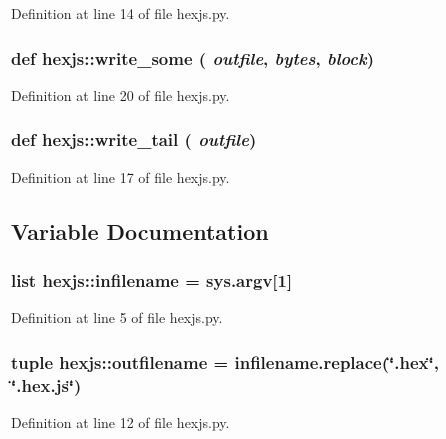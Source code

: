 Definition at line 14 of file hexjs.py.

\hypertarget{namespacehexjs_a4e78f97739ff44f824e42ecf26fa31e7}{
\subsubsection[{write\_\-some}]{\setlength{\rightskip}{0pt plus 5cm}def hexjs::write\_\-some ( {\em outfile}, \/   {\em bytes}, \/   {\em block})}}
\label{namespacehexjs_a4e78f97739ff44f824e42ecf26fa31e7}


Definition at line 20 of file hexjs.py.

\hypertarget{namespacehexjs_af0932b2aeffceebd34dddb90dd7ab27d}{
\subsubsection[{write\_\-tail}]{\setlength{\rightskip}{0pt plus 5cm}def hexjs::write\_\-tail ( {\em outfile})}}
\label{namespacehexjs_af0932b2aeffceebd34dddb90dd7ab27d}


Definition at line 17 of file hexjs.py.



\subsection{Variable Documentation}
\hypertarget{namespacehexjs_adb5213a3eff5b36bd5225eba0dee91ef}{
\subsubsection[{infilename}]{\setlength{\rightskip}{0pt plus 5cm}list {\bf hexjs::infilename} = sys.argv\mbox{[}1\mbox{]}}}
\label{namespacehexjs_adb5213a3eff5b36bd5225eba0dee91ef}


Definition at line 5 of file hexjs.py.

\hypertarget{namespacehexjs_a23feae6d177f8d14fac8d81d089abd7c}{
\subsubsection[{outfilename}]{\setlength{\rightskip}{0pt plus 5cm}tuple {\bf hexjs::outfilename} = infilename.replace(\char`\"{}.hex\char`\"{}, \char`\"{}.hex.js\char`\"{})}}
\label{namespacehexjs_a23feae6d177f8d14fac8d81d089abd7c}


Definition at line 12 of file hexjs.py.

